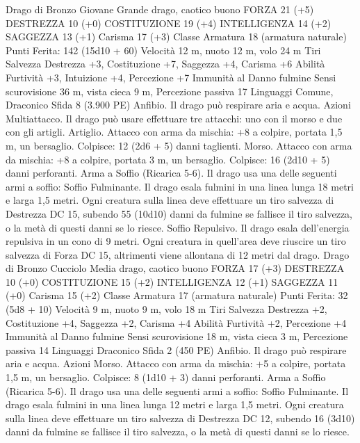 \begin{multicols}{2}
Drago di Bronzo Giovane
Grande drago, caotico buono
FORZA 21 (+5)
DESTREZZA 10 (+0)
COSTITUZIONE 19 (+4)
INTELLIGENZA 14 (+2)
SAGGEZZA 13 (+1)
Carisma 17 (+3)
Classe Armatura 18 (armatura naturale)
\hspace*{0pt}\hfill{Punti Ferita}: 142 (15d10 + 60)
Velocità 12 m, nuoto 12 m, volo 24 m
Tiri Salvezza Destrezza +3, Costituzione +7, Saggezza +4,
Carisma +6
Abilità Furtività +3, Intuizione +4, Percezione +7
Immunità al Danno fulmine
Sensi scurovisione 36 m, vista cieca 9 m, Percezione passiva 17
Linguaggi Comune, Draconico
Sfida 8 (3.900 PE)
Anfibio. Il drago può respirare aria e acqua.
Azioni
Multiattacco. Il drago può usare effettuare tre attacchi: uno con
il morso e due con gli artigli.
Artiglio. Attacco con arma da mischia: +8 a colpire, portata 1,5
m, un bersaglio.
Colpisce: 12 (2d6 + 5) danni taglienti.
Morso. Attacco con arma da mischia: +8 a colpire, portata 3 m,
un bersaglio.
Colpisce: 16 (2d10 + 5) danni perforanti.
Arma a Soffio (Ricarica 5-6). Il drago usa una delle seguenti armi
a soffio:
Soffio Fulminante. Il drago esala fulmini in una linea lunga 18 metri
e larga 1,5 metri. Ogni creatura sulla linea deve effettuare un tiro
salvezza di Destrezza DC 15, subendo 55 (10d10) danni da fulmine
se fallisce il tiro salvezza, o la metà di questi danni se lo riesce.
Soffio Repulsivo. Il drago esala dell’energia repulsiva in un cono di 9
metri. Ogni creatura in quell’area deve riuscire un tiro salvezza di
Forza DC 15, altrimenti viene allontana di 12 metri dal drago.
Drago di Bronzo Cucciolo
Media drago, caotico buono
FORZA 17 (+3)
DESTREZZA 10 (+0)
COSTITUZIONE 15 (+2)
INTELLIGENZA 12 (+1)
SAGGEZZA 11 (+0)
Carisma 15 (+2)
Classe Armatura 17 (armatura naturale)
\hspace*{0pt}\hfill{Punti Ferita}: 32 (5d8 + 10)
Velocità 9 m, nuoto 9 m, volo 18 m
Tiri Salvezza Destrezza +2, Costituzione +4, Saggezza +2,
Carisma +4
Abilità Furtività +2, Percezione +4
Immunità al Danno fulmine
Sensi scurovisione 18 m, vista cieca 3 m, Percezione passiva 14
Linguaggi Draconico
Sfida 2 (450 PE)
Anfibio. Il drago può respirare aria e acqua.
Azioni
Morso. Attacco con arma da mischia: +5 a colpire, portata 1,5
m, un bersaglio.
Colpisce: 8 (1d10 + 3) danni perforanti.
Arma a Soffio (Ricarica 5-6). Il drago usa una delle seguenti armi
a soffio:
Soffio Fulminante. Il drago esala fulmini in una linea lunga 12 metri
e larga 1,5 metri. Ogni creatura sulla linea deve effettuare un tiro
salvezza di Destrezza DC 12, subendo 16 (3d10) danni da fulmine se
fallisce il tiro salvezza, o la metà di questi danni se lo riesce.

\end{multicols}
